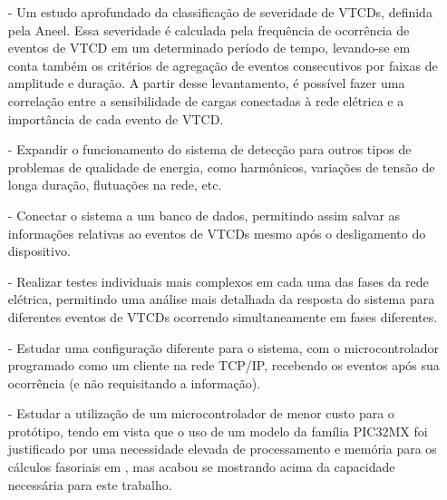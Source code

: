 \begin{itemize}
\item [-] Um estudo aprofundado da classifica{\c{c}}{\~a}o de severidade de VTCDs, definida pela Aneel. Essa severidade {\'e} calculada pela frequ{\^e}ncia de ocorr{\^e}ncia de eventos de VTCD em um determinado per{\'i}odo de tempo, levando-se em conta tamb{\'e}m os crit{\'e}rios de agrega{\c{c}}{\~a}o de eventos consecutivos por faixas de amplitude e dura{\c{c}}{\~a}o. A partir desse levantamento, {\'e} poss{\'i}vel fazer uma correla{\c{c}}{\~a}o entre a sensibilidade de cargas conectadas {\`a} rede el{\'e}trica e a import{\^a}ncia de cada evento de VTCD.
\item [-] Expandir o funcionamento do sistema de detec{\c{c}}{\~a}o para outros tipos de problemas de qualidade de energia, como harm{\^o}nicos, varia{\c{c}}{\~o}es de tens{\~a}o de longa dura{\c{c}}{\~a}o, flutua{\c{c}}{\~o}es na rede, etc. 
\item [-] Conectar o sistema a um banco de dados, permitindo assim salvar as informa{\c{c}}{\~o}es relativas ao eventos de VTCDs mesmo ap{\'o}s o desligamento do dispositivo.
\item [-] Realizar testes individuais mais complexos em cada uma das fases da rede el{\'e}trica, permitindo uma an{\'a}lise mais detalhada da resposta do sistema para diferentes eventos de VTCDs ocorrendo simultaneamente em fases diferentes.
\item [-] Estudar uma configura{\c{c}}{\~a}o diferente para o sistema, com o microcontrolador programado como um cliente na rede TCP/IP, recebendo os eventos ap{\'o}s sua ocorr{\^e}ncia (e n{\~a}o requisitando a informa{\c{c}}{\~a}o).
\item [-] Estudar a utiliza{\c{c}}{\~a}o de um microcontrolador de menor custo para o prot{\'o}tipo, tendo em vista que o uso de um modelo da fam{\'i}lia PIC32MX foi justificado por uma necessidade elevada de processamento e mem{\'o}ria para os c{\'a}lculos fasoriais em , mas acabou se mostrando acima da capacidade necess{\'a}ria para este trabalho.
\end{itemize}